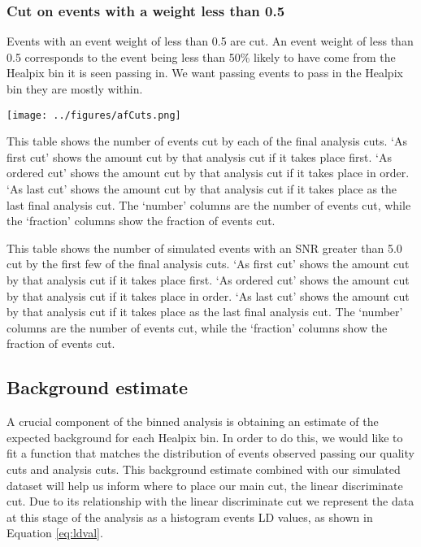 \subsubsection{Cut on events with a weight less than 0.5}

Events with an event weight of less than 0.5 are cut.  An event weight of less than 0.5 corresponds to the event being less than 50\% likely to have come from the Healpix bin it is seen passing in.  We want passing events to pass in the Healpix bin they are mostly within.

\begin{table}[h]
\centering
\texttt{[image: ../figures/afCuts.png]}
\caption[Final Analysis Cuts]{This table shows the number of events cut by each of the final analysis cuts.  `As first cut' shows the amount cut by that analysis cut if it takes place first.  `As ordered cut' shows the amount cut by that analysis cut if it takes place in order.  `As last cut' shows the amount cut by that analysis cut if it takes place as the last final analysis cut.  The `number' columns are the number of events cut, while the `fraction' columns show the fraction of events cut.}
\label{tab:afcuts}
\end{table}

\begin{table}[h]
\centering
{}
\caption[Final Analysis Cuts Table for Simulated Events]{This table shows the number of simulated events with an SNR greater than 5.0 cut by the first few of the final analysis cuts.  `As first cut' shows the amount cut by that analysis cut if it takes place first.  `As ordered cut' shows the amount cut by that analysis cut if it takes place in order.  `As last cut' shows the amount cut by that analysis cut if it takes place as the last final analysis cut.  The `number' columns are the number of events cut, while the `fraction' columns show the fraction of events cut.}
\label{tab:afcutsSim}
\end{table}

\subsection{Background estimate} \label{subsec:bgEstStart}

A crucial component of the binned analysis is obtaining an estimate of the expected background for each Healpix bin.  In order to do this, we would like to fit a function that matches the distribution of events observed passing our quality cuts and analysis cuts.  This background estimate combined with our simulated dataset will help us inform where to place our main cut, the linear discriminate cut.  Due to its relationship with the linear discriminate cut we represent the data at this stage of the analysis as a histogram events LD values, as shown in Equation \ref{eq:ldval}.

